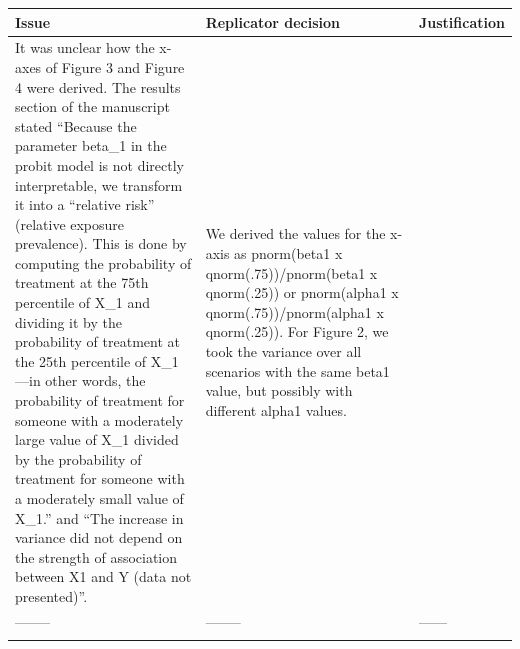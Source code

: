 \documentclass[10,a4paperpaper,]{article}
\begin{document}
\begin{longtable}[]{@{}lll@{}}
\toprule
\begin{minipage}[b]{0.33\columnwidth}\raggedright
Issue\strut
\end{minipage} & \begin{minipage}[b]{0.33\columnwidth}\raggedright
Replicator decision\strut
\end{minipage} & \begin{minipage}[b]{0.25\columnwidth}\raggedright
Justification\strut
\end{minipage}\tabularnewline
\midrule
\endhead
\begin{minipage}[t]{0.33\columnwidth}\raggedright
It was unclear how the x-axes of Figure 3 and Figure 4 were derived. The
results section of the manuscript stated ``Because the parameter beta\_1
in the probit model is not directly interpretable, we transform it into
a ``relative risk'' (relative exposure prevalence). This is done by
computing the probability of treatment at the 75th percentile of X\_1
and dividing it by the probability of treatment at the 25th percentile
of X\_1---in other words, the probability of treatment for someone with
a moderately large value of X\_1 divided by the probability of treatment
for someone with a moderately small value of X\_1.'' and ``The increase
in variance did not depend on the strength of association between X1 and
Y (data not presented)''.\strut
\end{minipage} & \begin{minipage}[t]{0.33\columnwidth}\raggedright
We derived the values for the x-axis as pnorm(beta1 x
qnorm(.75))/pnorm(beta1 x qnorm(.25)) or pnorm(alpha1 x
qnorm(.75))/pnorm(alpha1 x qnorm(.25)). For Figure 2, we took the
variance over all scenarios with the same beta1 value, but possibly with
different alpha1 values.\strut
\end{minipage} & \begin{minipage}[t]{0.25\columnwidth}\raggedright
\strut
\end{minipage}\tabularnewline
\begin{minipage}[t]{0.33\columnwidth}\raggedright
--------\strut
\end{minipage} & \begin{minipage}[t]{0.33\columnwidth}\raggedright
--------\strut
\end{minipage} & \begin{minipage}[t]{0.25\columnwidth}\raggedright
------\strut
\end{minipage}\tabularnewline
\begin{minipage}[t]{0.33\columnwidth}\raggedright

\end{minipage}
\end{longtable}
\end{document}
